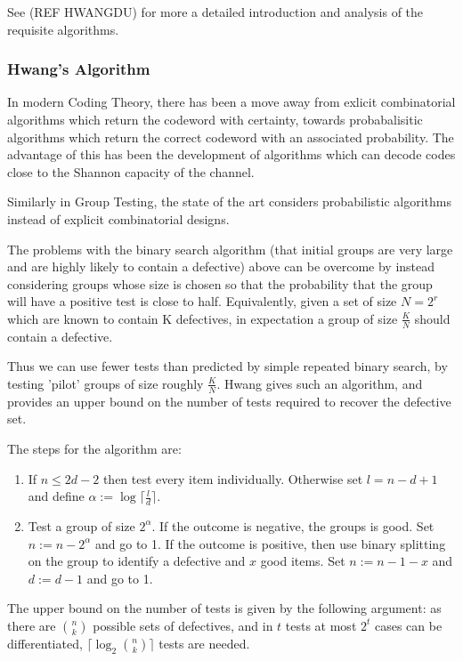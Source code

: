 \documentclass[conference]{IEEEtran}
\begin{document}
See (REF HWANGDU) for more a detailed introduction and analysis of the requisite algorithms.

\subsubsection*{Hwang's Algorithm}
In modern Coding Theory, there has been a move away from exlicit combinatorial algorithms which return the codeword with certainty, towards probabalisitic algorithms which return the correct codeword with an associated probability. The advantage of this has been the development of algorithms which can decode codes close to the Shannon capacity of the channel.

Similarly in Group Testing, the state of the art considers probabilistic algorithms instead of explicit combinatorial designs. 

The problems with the binary search algorithm (that initial groups are very large and are highly likely to contain a defective) above can be overcome by instead considering groups whose size is chosen so that the probability that the group will have a positive test is close to half. Equivalently, given a set of size \(N=2^r\) which are known to contain K defectives, in expectation a group of size \(\frac{K}{N}\) should contain a defective. 

Thus we can use fewer tests than predicted by simple repeated binary search, by testing 'pilot' groups of size roughly \(\frac{K}{N}\). Hwang \cite{Hwang1972} gives such an algorithm, and provides an upper bound on the number of tests required to recover the defective set.

The steps for the algorithm are:

\begin{enumerate}
\item If \(n \leq 2d-2\) then test every item individually. Otherwise set \(l = n - d + 1\) and define \(\alpha:=\log{\lceil \frac{l}{d}\rceil}\).
\item Test a group of size \(2^\alpha\). If the outcome is negative, the groups is good. Set \(n := n - 2^\alpha \) and go to 1. If the outcome is positive, then use binary splitting on the group to identify a defective and \(x\) good items. Set \(n := n - 1 -x \) and \(d:= d-1\) and go to 1.
\end{enumerate}

The upper bound on the number of tests is given by the following argument: as there are \(n \choose k\) possible sets of defectives, and in \(t\) tests at most \(2^t\) cases can be differentiated, \(\lceil \log_2{n \choose k} \rceil\) tests are needed. 
\end{document}

